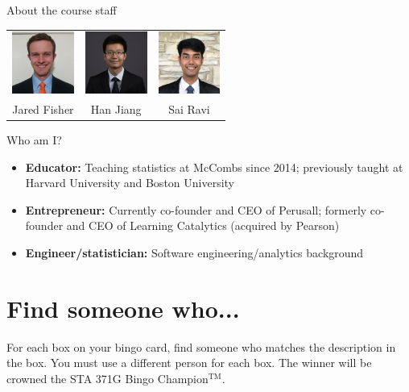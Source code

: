 \documentclass{beamer}\usepackage[]{graphicx}\usepackage[]{color}
\begin{document}
\begin{darkframes}
\begin{frame}{About the course staff}
\begin{itemize}
          \vspace{0.2in}
          \begin{tabular}{ccc}
            \includegraphics[width=0.8in]{jared} &
            \includegraphics[width=0.8in]{han} &
            \includegraphics[width=0.8in]{sai} \\
            Jared Fisher & Han Jiang & Sai Ravi \\
          \end{tabular}
      \end{itemize}
    \end{frame}

    \begin{frame}{Who am I?}
      \begin{itemize}
        \item \textbf{Educator:} Teaching statistics at McCombs since 2014; previously taught at Harvard University and Boston University
        \item \textbf{Entrepreneur:} Currently co-founder and CEO of Perusall; formerly co-founder and CEO of Learning Catalytics (acquired by Pearson)
        \item \textbf{Engineer/statistician:} Software engineering/analytics background
      \end{itemize}
    \end{frame}

    \section{Find someone who...}

    \begin{frame}{}
      \begin{center}
        For each box on your bingo card, find someone who matches the description in the box. You must use a different person for each box.
        \vfill
        The winner will be crowned the STA 371G Bingo Champion$^{\text{TM}}$.
      \end{center}
    \end{frame}


\end{darkframes}
\end{document}
